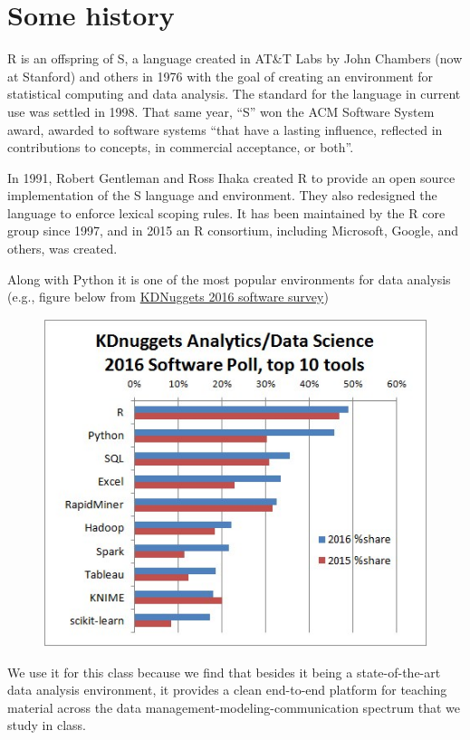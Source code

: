 \documentclass[12pt,]{book}
\theoremstyle{definition}
\theoremstyle{definition}
\theoremstyle{definition}
\theoremstyle{remark}
\begin{document}
\section{Some history}\label{some-history}

R is an offspring of S, a language created in AT\&T Labs by John
Chambers (now at Stanford) and others in 1976 with the goal of creating
an environment for statistical computing and data analysis. The standard
for the language in current use was settled in 1998. That same year,
``S'' won the ACM Software System award, awarded to software systems
``that have a lasting influence, reflected in contributions to concepts,
in commercial acceptance, or both''.

In 1991, Robert Gentleman and Ross Ihaka created R to provide an open
source implementation of the S language and environment. They also
redesigned the language to enforce lexical scoping rules. It has been
maintained by the R core group since 1997, and in 2015 an R consortium,
including Microsoft, Google, and others, was created.

Along with Python it is one of the most popular environments for data
analysis (e.g., figure below from
\href{http://www.kdnuggets.com/2016/06/r-python-top-analytics-data-mining-data-science-software.html}{KDNuggets
2016 software survey})

\begin{figure}
\centering
\includegraphics{img/kdnuggets-2016.jpg}
\caption{}
\end{figure}

We use it for this class because we find that besides it being a
state-of-the-art data analysis environment, it provides a clean
end-to-end platform for teaching material across the data
management-modeling-communication spectrum that we study in class.
\end{document}
